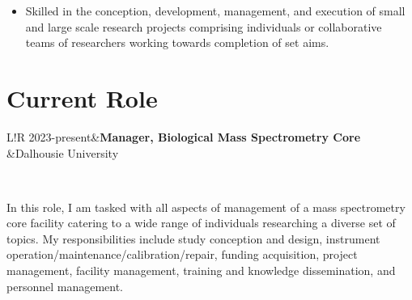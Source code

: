 \documentclass[11pt]{article}
\newcommand\VRule{\color{lightgray}\vrule width 0.5pt}
\begin{document}
\begin{addmargin}[3em]{2em}
\begin{itemize}
		\item Skilled in the conception, development, management, and execution of small and large scale research projects comprising individuals or collaborative teams of researchers working towards completion of set aims.
	\end{itemize}
\end{addmargin}

\section*{Current Role}
\begin{tabular}{L!{\VRule}R}
	2023-present&\textbf{Manager, Biological Mass Spectrometry Core}\\
	&Dalhousie University\\
\end{tabular}\\

\begin{addmargin}[7.5em]{2em}%
	In this role, I am tasked with all aspects of management of a mass spectrometry core facility catering to a wide range of individuals researching a diverse set of topics. My responsibilities include study conception and design, instrument operation/maintenance/calibration/repair, funding acquisition, project management, facility management, training and knowledge dissemination, and personnel management. 
\end{addmargin}
\end{document}
